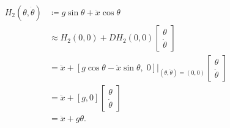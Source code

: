 \begin{align*}
H_2(\theta, \dot \theta) &\coloneq g \sin \theta + \ddot x \cos \theta\\
&\approx H_2(0, 0) + DH_2(0, 0)
    \begin{bmatrix}
        \theta\\
        \dot \theta
    \end{bmatrix}\\
&= \ddot x + \left[g \cos \theta - \ddot x \sin \theta, \; 0\right]
\bigg|_{(\theta, \dot \theta) = (0, 0)}
    \begin{bmatrix}
        \theta\\
        \dot \theta
    \end{bmatrix}\\
&= \ddot x + \left[g, 0\right]
    \begin{bmatrix}
        \theta\\
        \dot \theta
    \end{bmatrix}\\
&= \ddot x + g \theta.
\end{align*}
